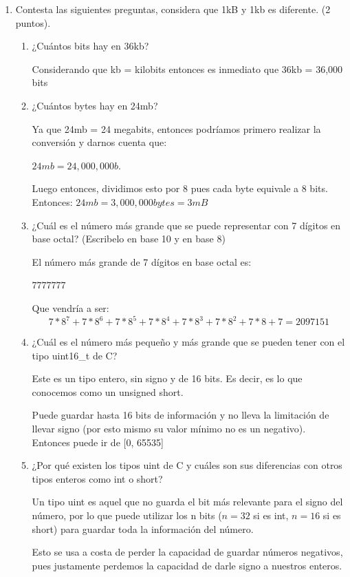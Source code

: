 \documentclass[12pt,letterpaper]{article}
\begin{document}
\begin{enumerate}
    \item Contesta las siguientes preguntas, considera que 1kB y 1kb es diferente. (2 puntos).

    \begin{enumerate}
        \item ¿Cuántos bits hay en 36kb?


          Considerando que kb = kilobits entonces es inmediato que 36kb = 36,000 bits
        \item ¿Cuántos bytes hay en 24mb?


          Ya que 24mb = 24 megabits, entonces podríamos primero realizar la conversión y darnos cuenta que:

          $24mb = 24,000,000 b$.

          Luego entonces, dividimos esto por 8 pues cada byte equivale a 8 bits. Entonces: $24mb = 3,000,000 bytes = 3mB$
        \item ¿Cuál es el número más grande que se puede representar con 7 dígitos en base octal? (Escribelo en base 10 y en base 8)


          El número más grande de 7 dígitos en base octal es:

          $7777777$

          Que vendría a ser:
          \[7 * 8^7 + 7 * 8^6 + 7 * 8^5 + 7 * 8 ^4 + 7 * 8^3 + 7 * 8^2 + 7 * 8 + 7 = 2097151\]
        \item ¿Cuál es el número más pequeño y más grande que se pueden tener con el tipo uint16\_t de C?


          Este es un tipo entero, sin signo y de 16 bits. Es decir, es lo que conocemos como un unsigned short.

          Puede guardar hasta 16 bits de información y no lleva la limitación de llevar signo (por esto mismo su valor mínimo no es un negativo). Entonces puede ir de [0, 65535]

        \item ¿Por qué existen los tipos uint de C y cuáles son sus diferencias con otros tipos enteros como int o short?


          Un tipo uint es aquel que no guarda el bit más relevante para el signo del número, por lo que puede utilizar los n bits ($n = 32$ si es int, $n = 16$ si es short) para guardar toda la información del número.

          Esto se usa a costa de perder la capacidad de guardar números negativos, pues justamente perdemos la capacidad de darle signo a nuestros enteros.


\end{enumerate}
\end{enumerate}
\end{document}
